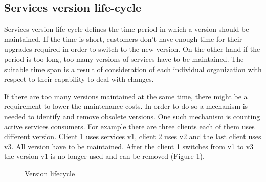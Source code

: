 \subsection{Services version life-cycle}
Services version life-cycle defines the time period in which a version should be maintained. If the time is short, customers don't have enough time for their upgrades required in order to switch to the new version. On the other hand if the period is too long, too many versions of services have to be maintained. The suitable time span is a result of consideration of each individual organization with respect to their capability to deal with changes.

If there are too many versions maintained at the same time, there might be a requirement to lower the maintenance costs. In order to do so a mechanism is needed to identify and remove obsolete versions. One such mechanism is counting active services consumers. For example there are three clients each of them uses different version. Client 1 uses services v1, client 2 uses v2 and the last client uses v3. All version have to be maintained. After the client 1 switches from v1 to v3 the version v1 is no longer used and can be removed (Figure \ref{fig:version-life-cycle}).

\begin{figure}[htp] 
\caption{Version lifecycle}
\label{fig:version-life-cycle}
\end{figure} 




